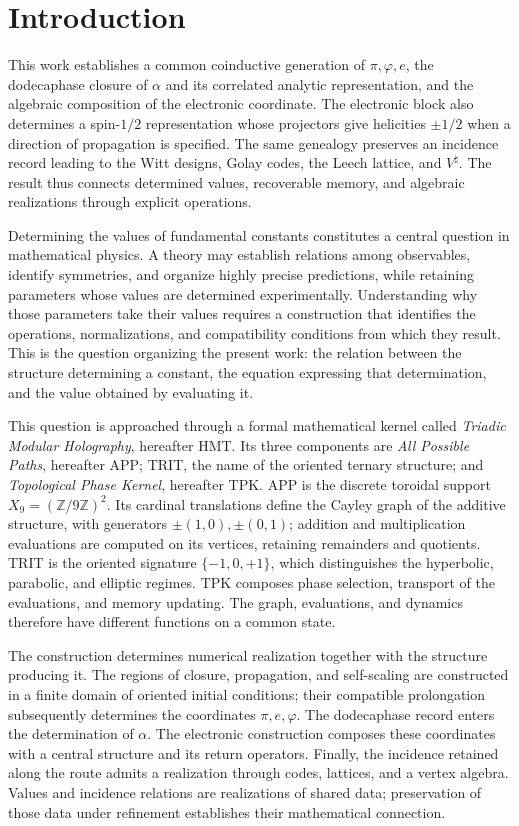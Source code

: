 \section{Introduction}
\label{sec:introduccion}

This work establishes a common coinductive generation of
\(\pi,\varphi,e\), the dodecaphase closure of \(\alpha\) and its
correlated analytic representation, and the algebraic composition of
the electronic coordinate. The electronic block also determines a
spin-\(1/2\) representation whose projectors give helicities
\(\pm1/2\) when a direction of propagation is specified. The same
genealogy preserves an incidence record leading to the Witt designs,
Golay codes, the Leech lattice, and \(V^\natural\). The result thus
connects determined values, recoverable memory, and algebraic
realizations through explicit operations.

Determining the values of fundamental constants constitutes a
central question in mathematical physics. A theory may establish relations
among observables, identify symmetries, and organize highly precise predictions,
while retaining parameters whose values are determined experimentally.
Understanding why those parameters take their values requires a construction
that identifies the operations, normalizations, and compatibility
conditions from which they result. This is the question organizing the present
work: the relation between the structure determining a constant, the equation
expressing that determination, and the value obtained by evaluating it.

This question is approached through a formal mathematical kernel called
\emph{Triadic Modular Holography}, hereafter HMT. Its three components are
\emph{All Possible Paths}, hereafter APP; TRIT, the name of the oriented
ternary structure; and \emph{Topological Phase Kernel}, hereafter TPK.
APP is the discrete toroidal support \(X_9=(\mathbb Z/9\mathbb Z)^2\).
Its cardinal translations define the Cayley graph of the additive
structure, with generators \(\pm(1,0),\pm(0,1)\); addition and
multiplication evaluations are computed on its vertices, retaining
remainders and quotients. TRIT is the oriented signature
\(\{-1,0,+1\}\), which distinguishes the hyperbolic, parabolic, and
elliptic regimes. TPK composes phase selection, transport of the
evaluations, and memory updating. The graph, evaluations, and dynamics
therefore have different functions on a common state.

The construction determines numerical realization together with the
structure producing it. The regions of closure, propagation, and
self-scaling are constructed in a finite domain of oriented initial
conditions; their compatible prolongation subsequently determines the coordinates
\(\pi,e,\varphi\). The dodecaphase record enters the determination of
\(\alpha\). The electronic construction composes these coordinates with a
central structure and its return operators. Finally, the incidence
retained along the route admits a realization through codes,
lattices, and a vertex algebra. Values and incidence relations are
realizations of shared data; preservation of those data under refinement
establishes their mathematical connection.

